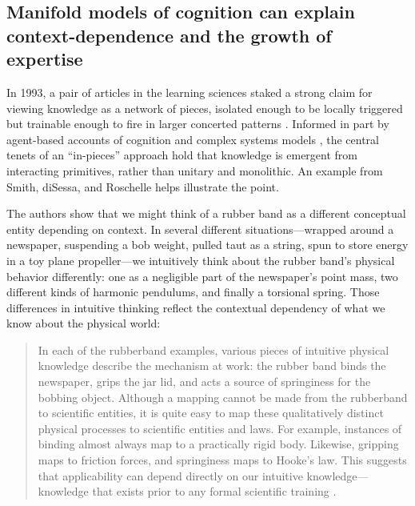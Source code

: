 \subsection{Manifold models of cognition can explain context-dependence
and the growth of
expertise}\label{manifold-models-of-cognition-explain-context-dependence-and-the-growth-of-expertise}

In 1993, a pair of articles in the learning sciences staked a strong
claim for viewing knowledge as a network of pieces, isolated enough to
be locally triggered but trainable enough to fire in larger concerted
patterns \cite{disessa_epistemology_1993,smith_misconceptions_1993}. Informed
in part by agent-based accounts of cognition \cite{minsky_society_1986} and complex
systems models \cite{disessa_why_2002}, the central tenets of an ``in-pieces''
approach hold that knowledge is emergent from interacting primitives,
rather than unitary and monolithic. An example from Smith, diSessa, and
Roschelle helps illustrate the point.

The authors show that we might think of a rubber band as a different
conceptual entity depending on context. In several different
situations---wrapped around a newspaper, suspending a bob weight, pulled taut as a string, spun
to store energy in a toy plane propeller---we intuitively think about
the rubber band's physical behavior differently: one as a negligible
part of the newspaper's point mass, two different kinds of harmonic pendulums, and finally a torsional spring. Those
differences in intuitive thinking reflect the contextual dependency of
what we know about the physical world:

\begin{quote}
  In each of the rubberband examples, various pieces of intuitive physical
  knowledge describe the mechanism at work: the rubber band binds the
  newspaper, grips the jar lid, and acts a source of springiness for the
  bobbing object. Although a mapping cannot be made from the rubberband to
  scientific entities, it is quite easy to map these qualitatively
  distinct physical processes to scientific entities and laws. For
  example, instances of binding almost always map to a practically rigid
  body. Likewise, gripping maps to friction forces, and springiness maps
  to Hooke's law. This suggests that applicability can depend directly on
  our intuitive knowledge---knowledge that exists prior to any formal
  scientific training \cite{smith_misconceptions_1993}.
\end{quote}

